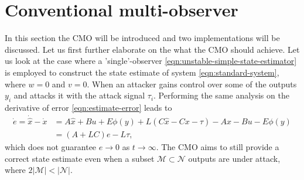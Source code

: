 

\section{Conventional multi-observer}
In this section the CMO will be introduced and two implementations will be discussed. Let us first further elaborate on the what the CMO should achieve. Let us look at the case where a 'single'-observer \eqref{eqn:unstable-simple-state-estimator} is employed to construct the state estimate of system \eqref{eqn:standard-system}, where $w=0$ and $v=0$. When an attacker gains control over some of the outputs $y_i$ and attacks it with the attack signal $\tau_i$. Performing the same analysis on the derivative of error \eqref{eqn:estimate-error} leads to
\begin{equation*}
    \begin{split}
        \dot{e} = \dot{\hat{x}} - \dot{x} &= A\hat{x} + Bu + E\phi(y) + L(C\hat{x} - Cx - \tau) - Ax - Bu - E\phi(y) \\
        &= (A+LC)e - L\tau,
    \end{split}
\end{equation*}
which does not guarantee $e \rightarrow 0$ as $t \rightarrow \infty$. The CMO aims to still provide a correct state estimate even when a subset $\mathcal{M} \subset \mathcal{N}$ outputs are under attack, where $2|\mathcal{M}| < |\mathcal{N}|$. 

